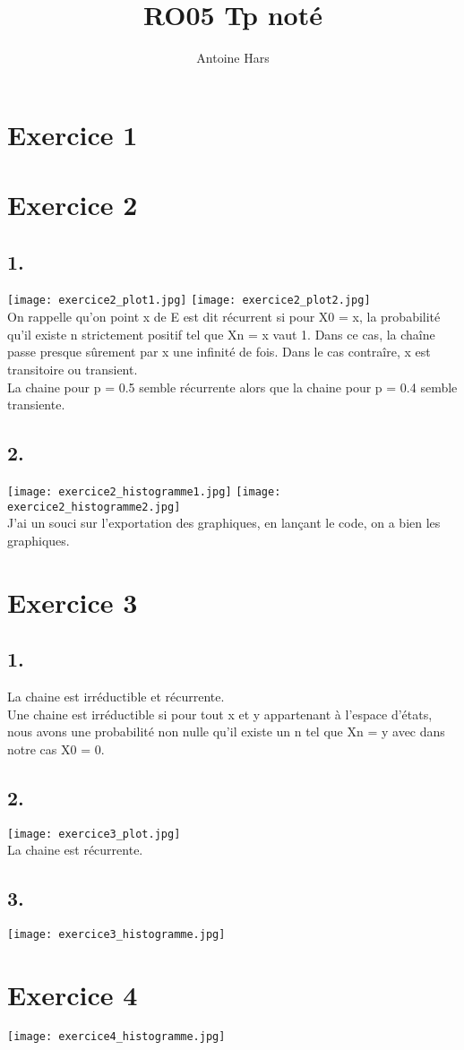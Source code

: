 \documentclass[a4paper, 10pt]{article}
\title{RO05 Tp noté}
\author{Antoine Hars}
\begin{document}
\maketitle

\section*{Exercice 1}

\section*{Exercice 2}
\subsection*{1.}
\texttt{[image: exercice2\_plot1.jpg]}
\texttt{[image: exercice2\_plot2.jpg]}\\
 On rappelle qu'on point x de E est dit récurrent si pour X0 = x, la probabilité qu'il existe n strictement positif tel que Xn = x vaut 1.
Dans ce cas, la chaîne passe presque sûrement par x une infinité de fois. Dans le cas contraîre, x est transitoire ou transient.\\
La chaine pour p = 0.5 semble récurrente alors que la chaine pour p = 0.4 semble transiente.
\subsection*{2.}
\texttt{[image: exercice2\_histogramme1.jpg]}
\texttt{[image: exercice2\_histogramme2.jpg]}\\
J'ai un souci sur l'exportation des graphiques, en lançant le code, on a bien les graphiques.

\section*{Exercice 3}
\subsection*{1.}
La chaine est irréductible et récurrente.\\
Une chaine est irréductible si pour tout x et y appartenant à l'espace d'états, nous avons une probabilité non nulle qu'il existe un n tel que Xn = y avec dans notre cas X0 = 0.\\

\subsection*{2.}
\texttt{[image: exercice3\_plot.jpg]}\\
La chaine est récurrente.

\subsection*{3.}
\texttt{[image: exercice3\_histogramme.jpg]}\\

\section*{Exercice 4}
\texttt{[image: exercice4\_histogramme.jpg]}
\end{document}
